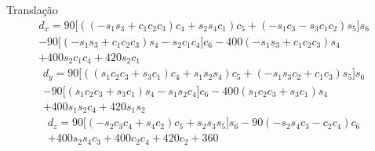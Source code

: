 \begin{frame}{Translação}
    \begin{multline*}
    d_{x} = 90 \Big[\left(\left(- s_1 s_3 + c_1 c_2 c_3\right) c_4 + s_2 s_4 c_1\right) c_5 + \left(- s_1 c_3 - s_3 c_1 c_2\right) s_5\Big] s_6 \\
    - 90 \Big[\left(- s_1 s_3 + c_1 c_2 c_3\right) s_4 - s_2 c_1 c_4\Big] c_6 - 400 \left(- s_1 s_3 + c_1 c_2 c_3\right) s_4 \\
    +400 s_2 c_1 c_4 + 420 s_2 c_1
\end{multline*}
\begin{multline*}
    d_y =
    90 \Big[\left(\left(s_1 c_2 c_3 + s_3 c_1\right) c_4 + s_1 s_2 s_4\right) c_5 + \left(- s_1 s_3 c_2 + c_1 c_3\right) s_5 \Big] s_6 \\
    - 90 \Big[\left(s_1 c_2 c_3 + s_3 c_1\right) s_4 - s_1 s_2 c_4\Big] c_6 - 400 \left(s_1 c_2 c_3 + s_3 c_1\right) s_4 \\
    + 400 s_1 s_2 c_4 + 420 s_1 s_2
\end{multline*}
\begin{multline*}
    d_z = 90 \Big[\left(- s_2 c_3 c_4 + s_4 c_2\right) c_5 + s_2 s_3 s_5\Big] s_6 - 90 \left(- s_2 s_4 c_3 - c_2 c_4\right) c_6 \\
    + 400 s_2 s_4 c_3 + 400 c_2 c_4 + 420 c_2 + 360
\end{multline*}
\end{frame}
\endgroup
